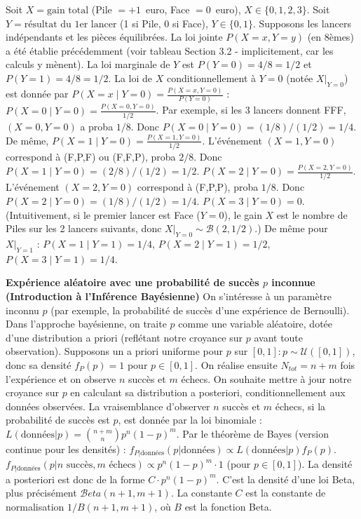 \begin{exemple} 
    Soit $X = \text{gain total}$ (Pile $= +1$~euro, Face $= 0$~euro), $X \in \{0, 1, 2, 3\}$. Soit $Y = \text{résultat du 1er lancer}$ (1 si Pile, 0 si Face), $Y \in \{0, 1\}$. Supposons les lancers indépendants et les pièces équilibrées. La loi jointe $P(X=x, Y=y)$ (en 8èmes) a été établie précédemment (voir tableau Section 3.2 - implicitement, car les calculs y mènent). La loi marginale de $Y$ est $P(Y=0) = 4/8 = 1/2$ et $P(Y=1) = 4/8 = 1/2$. La loi de $X$ conditionnellement à $Y=0$ (notée $X|_{Y=0}$) est donnée par $P(X=x \mid Y=0) = \frac{P(X=x, Y=0)}{P(Y=0)}$ : $P(X=0 \mid Y=0) = \frac{P(X=0, Y=0)}{1/2}$. Par exemple, si les 3 lancers donnent FFF, $(X=0, Y=0)$ a proba $1/8$. Donc $P(X=0 \mid Y=0) = (1/8)/(1/2) = 1/4$. De même, $P(X=1 \mid Y=0) = \frac{P(X=1, Y=0)}{1/2}$. L'événement $(X=1, Y=0)$ correspond à (F,P,F) ou (F,F,P), proba $2/8$. Donc $P(X=1 \mid Y=0) = (2/8)/(1/2) = 1/2$. $P(X=2 \mid Y=0) = \frac{P(X=2, Y=0)}{1/2}$. L'événement $(X=2, Y=0)$ correspond à (F,P,P), proba $1/8$. Donc $P(X=2 \mid Y=0) = (1/8)/(1/2) = 1/4$. $P(X=3 \mid Y=0) = 0$. (Intuitivement, si le premier lancer est Face ($Y=0$), le gain $X$ est le nombre de Piles sur les 2 lancers suivants, donc $X|_{Y=0} \sim \mathcal{B}(2, 1/2)$.) De même pour $X|_{Y=1}$ : $P(X=1 \mid Y=1) = 1/4$, $P(X=2 \mid Y=1) = 1/2$, $P(X=3 \mid Y=1) = 1/4$.
\end{exemple}

\noindent \textbf{Expérience aléatoire avec une probabilité de succès $p$ inconnue (Introduction à l'Inférence Bayésienne)} \quad On s'intéresse à un paramètre inconnu $p$ (par exemple, la probabilité de succès d'une expérience de Bernoulli). Dans l'approche bayésienne, on traite $p$ comme une variable aléatoire, dotée d'une distribution a priori (reflétant notre croyance sur $p$ avant toute observation). Supposons un a priori uniforme pour $p$ sur $[0, 1] : p \sim \mathcal{U}([0, 1])$, donc sa densité $f_P(p) = 1$ pour $p \in [0, 1]$. On réalise ensuite $N_{tot} = n+m$ fois l'expérience et on observe $n$ succès et $m$ échecs. On souhaite mettre à jour notre croyance sur $p$ en calculant sa distribution a posteriori, conditionnellement aux données observées. La vraisemblance d'observer $n$ succès et $m$ échecs, si la probabilité de succès est $p$, est donnée par la loi binomiale : $L(\text{données}|p) = \binom{n+m}{n} p^n (1-p)^m$. Par le théorème de Bayes (version continue pour les densités) : $f_{P|\text{données}}(p|\text{données}) \propto L(\text{données}|p) f_P(p)$. $f_{P|\text{données}}(p|n \text{ succès}, m \text{ échecs}) \propto p^n (1-p)^m \cdot 1$ (pour $p \in [0, 1]$). La densité a posteriori est donc de la forme $C \cdot p^n (1-p)^m$. C'est la densité d'une loi Beta, plus précisément $\mathcal{B}eta(n+1, m+1)$. La constante $C$ est la constante de normalisation $1/B(n+1, m+1)$, où $B$ est la fonction Beta.

